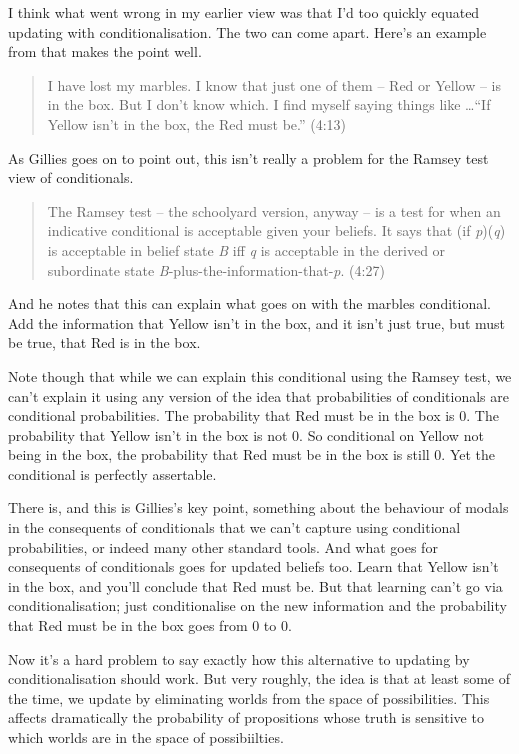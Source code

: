 I think what went wrong in my earlier view was that I'd too quickly equated updating with conditionalisation. The two can come apart. Here's an example from \cite{Gillies2010} that makes the point well. 

\begin{quote}I have lost my marbles. I know that just one of them -- Red or Yellow -- is in the box. But I don't know which. I find myself saying things like \dots ``If Yellow isn't in the box, the Red must be.'' (4:13)
\end{quote}
As Gillies goes on to point out, this isn't really a problem for the Ramsey test view of conditionals.
\begin{quote}
The Ramsey test -- the schoolyard version, anyway -- is a test for when an indicative conditional is acceptable given your beliefs. It says that (if \textit{p})(\textit{q}) is acceptable in belief state \textit{B} iff \textit{q} is acceptable in the derived or subordinate state \textit{B}-plus-the-information-that-\textit{p}. (4:27)
\end{quote}
And he notes that this can explain what goes on with the marbles conditional. Add the information that Yellow isn't in the box, and it isn't just true, but must be true, that Red is in the box.

Note though that while we can explain this conditional using the Ramsey test, we can't explain it using any version of the idea that probabilities of conditionals are conditional probabilities. The probability that Red must be in the box is 0. The probability that Yellow isn't in the box is not 0. So conditional on Yellow not being in the box, the probability that Red must be in the box is still 0. Yet the conditional is perfectly assertable.

There is, and this is Gillies's key point, something about the behaviour of modals in the consequents of conditionals that we can't capture using conditional probabilities, or indeed many other standard tools. And what goes for consequents of conditionals goes for updated beliefs too. Learn that Yellow isn't in the box, and you'll conclude that Red must be. But that learning can't go via conditionalisation; just conditionalise on the new information and the probability that Red must be in the box goes from 0 to 0.

Now it's a hard problem to say exactly how this alternative to updating by conditionalisation should work. But very roughly, the idea is that at least some of the time, we update by eliminating worlds from the space of possibilities. This affects dramatically the probability of propositions whose truth is sensitive to which worlds are in the space of possibiilties.

